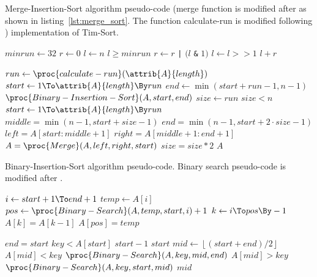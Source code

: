 \documentclass[sigconf, nonacm, natbib, screen, balance=False]{acmart}
\newcommand{\floor}[1]{\left\lfloor #1 \right\rfloor}
\begin{document}
\begin{listing}
  \caption{Merge-Insertion-Sort algorithm pseudo-code (merge function is modified after \citet[Ch.~2.3]{CLRS_2009} as shown in listing~\ref{lst:merge_sort}. The function calculate-run is modified following \citet{cpythonsourcecode}) implementation of Tim-Sort.}
  \label{lst:combined_sort}
  \begin{codebox}
  \li $minrun \gets 32$
  \li $r \gets 0$
  \li $l \gets n$
  \li \While $l \geq minrun$
  \Then
  \li    $r \gets r$ \verb+|+  $(l$ \verb|&| $1)$
  \li    $l \gets l >> 1$
  \End
  \li \Return $l+r$
  \end{codebox}
  \begin{codebox}
  \li $run \gets \proc{calculate-run}(\attrib{A}{length})$
  \li \For $start \gets 1 \To \attrib{A}{length} \By run$
  \li \Then $end \gets \min{(start+run-1, n-1)} $
  \li  $\proc{Binary-Insertion-Sort}(A, start, end)$
  \End
  \li $size \gets run$
  \li \While $size < n$
  \li \Then \For $start \gets 1 \To \attrib{A}{length} \By run$
  \Then  \li $middle = \min{(n-1, start+size-1)}$ 
  \li $end = \min{(n-1, start+2 \cdot size-1)}$
  \li $left = A[start:middle+1]$ 
  \li $right = A[middle+1: end+1]$ 
  \li $A = \proc{Merge}(A, left, right, start)$
  \End
  \li $size = size*2$
  \End
  \li \Return $A$
  \end{codebox}
\end{listing}

\begin{listing}
  \caption{Binary-Insertion-Sort algorithm pseudo-code. Binary search pseudo-code is modified after \citet{inproceedings}.}
  \label{lst:binary_sort}
  \begin{codebox}
  \li \For $i \gets start+1 \To end+1$
  \li \Then $temp \gets A[i] $
  \li  $pos \gets \proc{Binary-Search}(A, temp, start, i) + 1$
  \li \For $k \gets i \To pos \By -1$
  \li \Then $A[k] = A[k-1]$
  \End
  \li $A[pos] = temp$
  \End
  \end{codebox}
  \begin{codebox}
  \li \If $end = start$
  \li \Then \If $key < A[start]$
  \li \Then \Return $start - 1$
  \li \Else 
  \li \Return $start$
  \End
  \End
  \li $mid \gets \floor{(start+end)/2}$
  \li \If $A[mid] < key$
  \li \Then \Return $\proc{Binary-Search}(A, key, mid, end)$
  \li \ElseIf $A[mid] > key$
  \li \Then \Return $\proc{Binary-Search}(A, key, start, mid)$
  \li \Else
  \li \Return $mid$
  \end{codebox}
\end{listing}
\end{document}
